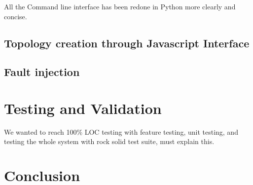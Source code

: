 \documentclass{eplmastersthesis}
\begin{document}
      All the Command line interface has been redone in Python more clearly and concise.

    \section{Topology creation through Javascript Interface}

    \section{Fault injection}



  \chapter{Testing and Validation}

    We wanted to reach 100\% LOC testing with feature testing, unit testing,
    and testing the whole system with rock solid test suite, must explain this.



  \chapter{Conclusion}

  \nocite{*}
  
  




  \backcoverpage
\end{document}
